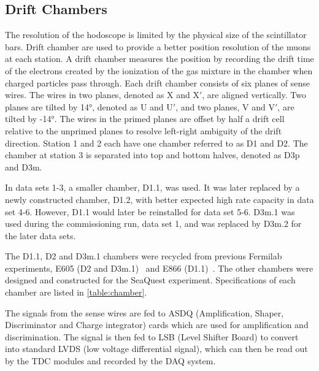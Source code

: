 \documentclass[../main.tex]{subfiles}
\begin{document}
\subsection{Drift Chambers}
The resolution of the hodoscope is limited by the physical size of the scintillator bars.
Drift chamber are used to provide a better position resolution of the muons at each station.
A drift chamber measures the position by recording the drift time of the electrons created
by the ionization of the gas mixture in the chamber when charged particles pass through.
Each drift chamber consists of six planes of sense wires. The wires in two planes,
denoted as X and X$'$, are aligned vertically. Two planes are tilted by \ang[retain-explicit-plus]{+14},
denoted as U and U$'$, and two planes, V and V$'$, are tilted by \ang[retain-explicit-plus]{-14}.
The wires in the primed planes are offset by half a drift cell relative to the
unprimed planes to resolve left-right ambiguity of the drift direction.
Station 1 and 2 each have one chamber referred to as D1 and D2. The chamber at station
3 is separated into top and bottom halves, denoted as D3p and D3m.

In data sets 1-3, a smaller chamber, D1.1, was used. It was later replaced by a newly constructed
chamber, D1.2, with better expected high rate capacity in data set 4-6. However, D1.1 would later be
reinstalled for data set 5-6. D3m.1 was used during the commissioning run, data set 1, and
was replaced by D3m.2 for the later data sets.

The D1.1, D2 and D3m.1 chambers were recycled from previous Fermilab experiments, E605 (D2 and D3m.1)~\cite{moreno1991}
and E866 (D1.1)~\cite{hawker1998}. The other chambers were designed and constructed for the SeaQuest experiment.
Specifications of each chamber are listed in \cref{table:chamber}.

The signals from the sense wires are fed to ASDQ (Amplification, Shaper, Discriminator and Charge integrator)
cards which are used for amplification and discrimination. The signal is then fed to LSB (Level Shifter Board)
to convert into standard LVDS (low voltage differential signal), which can then be read out by the TDC
modules and recorded by the DAQ system.
\end{document}

